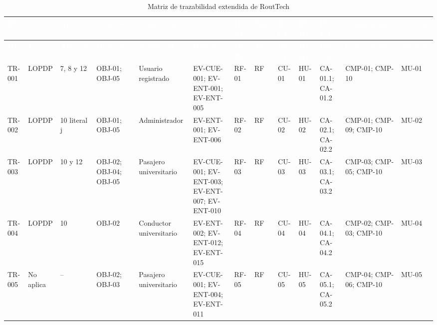 \documentclass[12pt,a4paper]{article}
\renewcommand{\arraystretch}{1.22}
\begin{document}
\begin{landscape}
\begingroup
\tiny
\setlength{\tabcolsep}{2.1pt}
\renewcommand{\arraystretch}{1.16}
\begin{longtable}{C{0.75cm} L{1.05cm} L{1.10cm} L{1.45cm} L{1.60cm} L{2.00cm} C{0.95cm} C{0.75cm} L{1.35cm} L{1.15cm} L{1.55cm} L{1.75cm} L{1.25cm}}
\caption{Matriz de trazabilidad extendida de RoutTech}\label{tab:matriz-trazabilidad-extendida}\\
\textcolor{white}{\textbf{ID}} &
\textcolor{white}{\textbf{Ley}} &
\textcolor{white}{\textbf{Artículo}} &
\textcolor{white}{\textbf{Objetivo}} &
\textcolor{white}{\textbf{Stakeholder}} &
\textcolor{white}{\textbf{ID-EV}} &
\textcolor{white}{\textbf{ID-RF}} &
\textcolor{white}{\textbf{Tipo}} &
\textcolor{white}{\textbf{ID-CU}} &
\textcolor{white}{\textbf{ID-HU}} &
\textcolor{white}{\textbf{ID-CA}} &
\textcolor{white}{\textbf{Componente}} &
\textcolor{white}{\textbf{Mockup}}\\
\endfirsthead
{}
\textcolor{white}{\textbf{ID}} &
\textcolor{white}{\textbf{Ley}} &
\textcolor{white}{\textbf{Artículo}} &
\textcolor{white}{\textbf{Objetivo}} &
\textcolor{white}{\textbf{Stakeholder}} &
\textcolor{white}{\textbf{ID-EV}} &
\textcolor{white}{\textbf{ID-RF}} &
\textcolor{white}{\textbf{Tipo}} &
\textcolor{white}{\textbf{ID-CU}} &
\textcolor{white}{\textbf{ID-HU}} &
\textcolor{white}{\textbf{ID-CA}} &
\textcolor{white}{\textbf{Componente}} &
\textcolor{white}{\textbf{Mockup}}\\
\endhead
TR-001 & LOPDP & 7, 8 y 12 & OBJ-01; OBJ-05 & Usuario registrado & EV-CUE-001; EV-ENT-001; EV-ENT-005 & RF-01 & RF & CU-01 & HU-01 & CA-01.1; CA-01.2 & CMP-01; CMP-10 & MU-01\\
TR-002 & LOPDP & 10 literal j & OBJ-01; OBJ-05 & Administrador & EV-ENT-001; EV-ENT-006 & RF-02 & RF & CU-02 & HU-02 & CA-02.1; CA-02.2 & CMP-01; CMP-09; CMP-10 & MU-02\\
TR-003 & LOPDP & 10 y 12 & OBJ-02; OBJ-04; OBJ-05 & Pasajero universitario & EV-CUE-001; EV-ENT-003; EV-ENT-007; EV-ENT-010 & RF-03 & RF & CU-03 & HU-03 & CA-03.1; CA-03.2 & CMP-03; CMP-05; CMP-10 & MU-03\\
TR-004 & LOPDP & 10 & OBJ-02 & Conductor universitario & EV-ENT-002; EV-ENT-012; EV-ENT-015 & RF-04 & RF & CU-04 & HU-04 & CA-04.1; CA-04.2 & CMP-02; CMP-03; CMP-10 & MU-04\\
TR-005 & No aplica & -- & OBJ-02; OBJ-03 & Pasajero universitario & EV-CUE-001; EV-ENT-004; EV-ENT-011 & RF-05 & RF & CU-05 & HU-05 & CA-05.1; CA-05.2 & CMP-04; CMP-06; CMP-10 & MU-05\\

\end{longtable}
\end{landscape}
\end{document}
